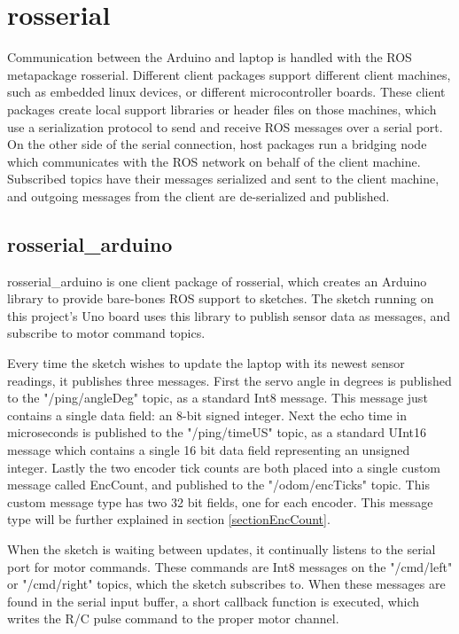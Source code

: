 \section{rosserial} \label{sectionRosSerial}
Communication between the Arduino and laptop is handled with the ROS metapackage rosserial. Different client packages support different client machines, such as embedded linux devices, or different microcontroller boards. These client packages create local support libraries or header files on those machines, which use a serialization protocol to send and receive ROS messages over a serial port. On the other side of the serial connection, host packages run a bridging node which communicates with the ROS network on behalf of the client machine. Subscribed topics have their messages serialized and sent to the client machine, and outgoing messages from the client are de-serialized and published. 

\subsection{rosserial\_arduino}
rosserial\_arduino is one client package of rosserial, which creates an Arduino library to provide bare-bones ROS support to sketches. The sketch running on this project's Uno board uses this library to publish sensor data as messages, and subscribe to motor command topics.

Every time the sketch wishes to update the laptop with its newest sensor readings, it publishes three messages. First the servo angle in degrees is published to the "/ping/angleDeg" topic, as a standard Int8 message. This message just contains a single data field: an 8-bit signed integer. Next the echo time in microseconds is published to the "/ping/timeUS" topic, as a standard UInt16 message which contains a single 16 bit data field representing an unsigned integer. Lastly the two encoder tick counts are both placed into a single custom message called EncCount, and published to the "/odom/encTicks" topic. This custom message type has two 32 bit fields, one for each encoder. This message type will be further explained in section \ref{sectionEncCount}.

When the sketch is waiting between updates, it continually listens to the serial port for motor commands. These commands are Int8 messages on the "/cmd/left" or "/cmd/right" topics, which the sketch subscribes to. When these messages are found in the serial input buffer, a short callback function is executed, which writes the R/C pulse command to the proper motor channel.

